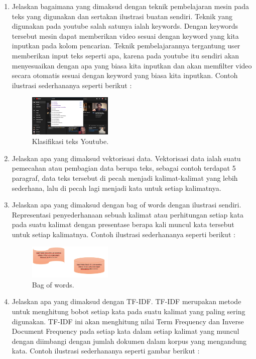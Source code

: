 \begin{enumerate}
	\item Jelaskan bagaimana yang dimaksud dengan teknik pembelajaran mesin pada teks yang digunakan dan sertakan ilustrasi buatan sendiri.
	\hfill\break
	Teknik yang digunakan pada youtube salah satunya ialah keywords. Dengan keywords tersebut mesin dapat memberikan video sesuai dengan keyword yang kita inputkan pada kolom pencarian. Teknik pembelajarannya tergantung user memberikan input teks seperti apa, karena pada youtube itu sendiri akan menyesuaikan dengan apa yang biasa kita inputkan dan akan memfilter video secara otomatis sesuai dengan keyword yang biasa kita inputkan. Contoh ilustrasi sederhananya seperti berikut :

	\begin{figure}[H]
	\centering
		\includegraphics[width=4cm]{figures/1174069/4/materi/3.PNG}
		\caption{Klasifikasi teks Youtube.}
	\end{figure}

	\item Jelaskan apa yang dimaksud vektorisasi data.
	\hfill\break
	Vektorisasi data ialah suatu pemecahan atau pembagian data berupa teks, sebagai contoh terdapat 5 paragraf, data teks tersebut di pecah menjadi kalimat-kalimat yang lebih sederhana, lalu di pecah lagi menjadi kata untuk setiap kalimatnya. 

	\item Jelaskan apa yang dimaksud dengan bag of words dengan ilustrasi sendiri.
	\hfill\break
	Representasi penyederhanaan sebuah kalimat atau perhitungan setiap kata pada suatu kalimat dengan presentase berapa kali muncul kata tersebut untuk setiap kalimatnya. Contoh ilustrasi sederhananya seperti berikut : 

	\begin{figure}[H]
	\centering
		\includegraphics[width=4cm]{figures/1174069/4/materi/4.PNG}
		\caption{Bag of words.}
	\end{figure}

	\item Jelaskan apa yang dimaksud dengan TF-IDF.
	\hfill\break
	TF-IDF merupakan metode untuk menghitung bobot setiap kata pada suatu kalimat yang paling sering digunakan. TF-IDF ini akan menghitung nilai Term Frequency dan Inverse Document Frequency pada setiap kata dalam setiap kalimat yang muncul dengan diimbangi dengan jumlah dokumen dalam korpus yang mengandung kata. Contoh ilustrasi sederhananya seperti gambar berikut : 


\end{enumerate}
